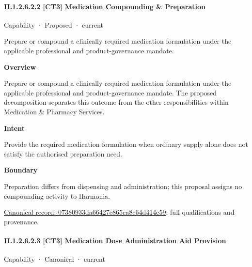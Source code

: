 \paragraph*{II.1.2.6.2.2 [CT3] Medication Compounding \& Preparation}
\label{navigation:II.1.2.6.2.2}

\label{element:07380933da66427c865ca8e64d414e59}
{\small Capability · Proposed · current}\par

Prepare or compound a clinically required medication formulation under the applicable professional and product-governance mandate.



\textbf{Overview}



Prepare or compound a clinically required medication formulation under the applicable professional and product-governance mandate. The proposed decomposition separates this outcome from the other responsibilities within Medication \& Pharmacy Services.



\textbf{Intent}



Provide the required medication formulation when ordinary supply alone does not satisfy the authorised preparation need.



\textbf{Boundary}



Preparation differs from dispensing and administration; this proposal assigns no compounding activity to Harmonia.


{\footnotesize \href{../../../../../../../continuum/strategy/capability/07380933da66427c865ca8e64d414e59.md}{Canonical record: 07380933da66427c865ca8e64d414e59}; full qualifications and provenance.}\par
\paragraph*{II.1.2.6.2.3 [CT3] Medication Dose Administration Aid Provision}
\label{navigation:II.1.2.6.2.3}

\label{element:bd597608766b4d709703977c02cc5f07}
{\small Capability · Canonical · current}\par

